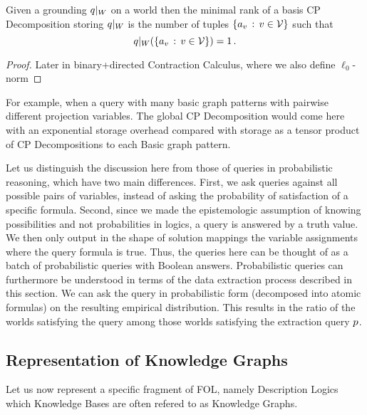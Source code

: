 \begin{theorem}
	Given a grounding ${q}|_{W}$ on a world then the minimal rank of a basis CP Decomposition storing ${q}|_{W}$  is the number of tuples $\{a_{v} \, : \, v\in\mathcal{V} \}$ such that
		\[ {q}|_{W}(\{a_{v} \, : \, v\in\mathcal{V} \}) = 1\, . \]
\end{theorem}
\begin{proof}
	Later in binary+directed Contraction Calculus, where we also define $\ell_0$-norm
\end{proof}

\begin{example}
	For example, when a query with many basic graph patterns with pairwise different projection variables. 
	The global CP Decomposition would come here with an exponential storage overhead compared with storage as a tensor product of CP Decompositions to each Basic graph pattern.
\end{example}


\begin{remark}
	Let us distinguish the discussion here from those of queries in probabilistic reasoning, which have two main differences.
	First, we ask queries against all possible pairs of variables, instead of asking the probability of satisfaction of a specific formula. 
	Second, since we made the epistemologic assumption of knowing possibilities and not probabilities in logics, a query is answered by a truth value.
	We then only output in the shape of solution mappings the variable assignments where the query formula is true.
 	Thus, the queries here can be thought of as a batch of probabilistic queries with Boolean answers.
	Probabilistic queries can furthermore be understood in terms of the data extraction process described in this section.
	We can ask the query in probabilistic form (decomposed into atomic formulas) on the resulting empirical distribution.
	This results in the ratio of the worlds satisfying the query among those worlds satisfying the extraction query $p$.
\end{remark}


\subsection{Representation of Knowledge Graphs}

Let us now represent a specific fragment of FOL, namely Description Logics which Knowledge Bases are often refered to as Knowledge Graphs.


